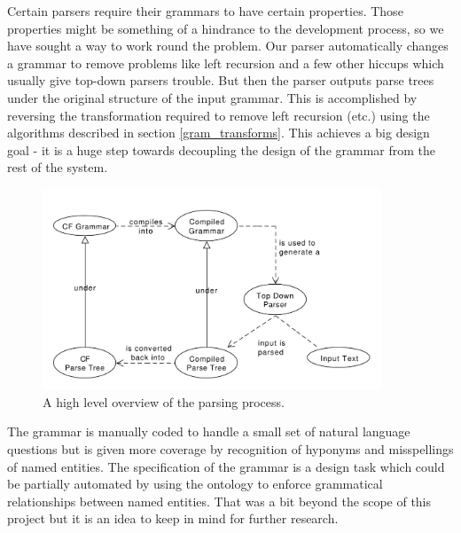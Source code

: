 \documentclass[11pt]{article}
\begin{document}
Certain parsers require their grammars to have certain properties. Those properties
might be something of a hindrance to the development process, so we have sought
a way to work round the problem. Our parser automatically changes a grammar
to remove problems like left recursion and a few other hiccups which usually 
give top-down parsers trouble. But then the parser outputs
parse trees under the original structure of the input grammar.
This is accomplished by reversing the transformation required to remove left
recursion (etc.) using the algorithms described in section \ref{gram_transforms}.
This achieves a big design goal - it is a huge step towards decoupling the
design of the grammar from the rest of the system.

\begin{figure}[h!]
    \centering
    \includegraphics[width=0.9\textwidth,natwidth=1,natheight=1]{umlet/high_level.pdf}
    \caption{A high level overview of the parsing process.}
    \label{fig:high_level_parse}
\end{figure}

The grammar is manually coded to handle a small set of natural language questions
but is given more coverage by recognition of hyponyms and misspellings of named entities.
The specification of the grammar is a design task which could be partially automated by
using the ontology to enforce grammatical relationships between named entities. That
was a bit beyond the scope of this project but it is an idea to keep in mind for further
research.
\end{document}
